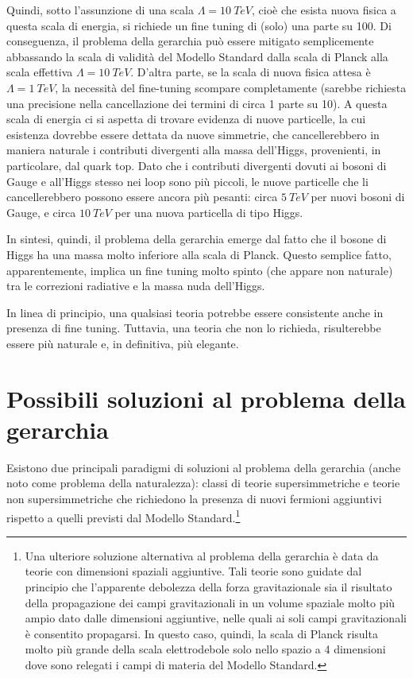 Quindi, sotto l'assunzione di una scala $\Lambda=10 ~TeV$, cioè che esista nuova fisica a questa scala di energia,
si richiede un fine tuning di (solo) una parte su 100.
\newline
Di conseguenza, il problema della gerarchia può essere mitigato semplicemente abbassando la scala di validità del Modello Standard
dalla scala di Planck alla scala effettiva $\Lambda=10 ~TeV$.
D'altra parte, se la scala di nuova fisica attesa è 
$\Lambda = 1 ~TeV$, la necessità del fine-tuning scompare completamente
(sarebbe richiesta una precisione nella cancellazione dei termini di circa 1 parte su 10).
\newline
A questa scala di energia ci si aspetta di trovare evidenza di nuove particelle, la cui esistenza dovrebbe essere
dettata da nuove simmetrie, che cancellerebbero in maniera naturale i contributi divergenti alla massa dell'Higgs,
provenienti, in particolare, dal quark top.
\newline
Dato che i contributi divergenti dovuti ai bosoni di Gauge e all'Higgs stesso nei loop sono più piccoli,
le nuove particelle che li cancellerebbero possono essere ancora più pesanti: circa $5 ~TeV$ per nuovi
bosoni di Gauge, e circa $10 ~TeV$ per una nuova particella di tipo Higgs.

\medskip
In sintesi, quindi, il problema della gerarchia emerge dal fatto che il bosone di Higgs ha una massa molto inferiore alla scala
di Planck.
\newline
Questo semplice fatto, apparentemente, implica un fine tuning molto spinto (che appare non naturale) tra le correzioni radiative 
e la massa nuda dell'Higgs.

In linea di principio, una qualsiasi teoria potrebbe essere consistente anche in presenza di fine tuning.
Tuttavia, una teoria che non lo richieda, risulterebbe essere più naturale e, in definitiva, più elegante. 

\section{Possibili soluzioni al problema della gerarchia}
Esistono due principali paradigmi di soluzioni al problema della gerarchia (anche noto come problema della naturalezza):
classi di teorie supersimmetriche e teorie non supersimmetriche che richiedono la presenza di nuovi fermioni aggiuntivi rispetto
a quelli previsti dal Modello Standard.\footnote{Una ulteriore soluzione alternativa al problema della gerarchia è data da teorie con dimensioni 
spaziali aggiuntive. Tali teorie sono guidate dal principio che l'apparente debolezza della forza gravitazionale sia 
il risultato della propagazione dei campi gravitazionali in un volume spaziale molto più ampio dato dalle dimensioni
aggiuntive, nelle quali ai soli campi 
gravitazionali è consentito propagarsi. In questo caso, quindi, la scala di Planck risulta molto più 
grande della scala elettrodebole solo nello spazio a 4 dimensioni dove sono relegati i campi di materia del Modello Standard.}


